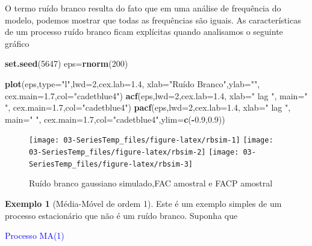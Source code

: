 \documentclass[
]{book}
\newenvironment{Shaded}{\begin{snugshade}}{\end{snugshade}}
\newcommand{\DataTypeTok}[1]{\textcolor[rgb]{0.13,0.29,0.53}{#1}}
\newcommand{\DecValTok}[1]{\textcolor[rgb]{0.00,0.00,0.81}{#1}}
\newcommand{\FloatTok}[1]{\textcolor[rgb]{0.00,0.00,0.81}{#1}}
\newcommand{\KeywordTok}[1]{\textcolor[rgb]{0.13,0.29,0.53}{\textbf{#1}}}
\newcommand{\NormalTok}[1]{#1}
\newcommand{\OperatorTok}[1]{\textcolor[rgb]{0.81,0.36,0.00}{\textbf{#1}}}
\newcommand{\StringTok}[1]{\textcolor[rgb]{0.31,0.60,0.02}{#1}}
\theoremstyle{definition}
\theoremstyle{definition}
\newtheorem{example}{Exemplo}[chapter]
\theoremstyle{definition}
\theoremstyle{remark}
\begin{document}
O termo ruído branco resulta do fato que em uma análise de frequência do modelo, podemos mostrar que todas as frequências são iguais. As características de um processo ruído branco ficam explícitas quando analisamos o seguinte gráfico

\begin{Shaded}
\begin{Highlighting}[]
\KeywordTok{set.seed}\NormalTok{(}\DecValTok{5647}\NormalTok{)}
\NormalTok{eps=}\KeywordTok{rnorm}\NormalTok{(}\DecValTok{200}\NormalTok{)}

\KeywordTok{plot}\NormalTok{(eps,}\DataTypeTok{type=}\StringTok{"l"}\NormalTok{,}\DataTypeTok{lwd=}\DecValTok{2}\NormalTok{,}\DataTypeTok{cex.lab=}\FloatTok{1.4}\NormalTok{, }\DataTypeTok{xlab=}\StringTok{"Ruído Branco"}\NormalTok{,}\DataTypeTok{ylab=}\StringTok{""}\NormalTok{, }\DataTypeTok{cex.main=}\FloatTok{1.7}\NormalTok{,}\DataTypeTok{col=}\StringTok{"cadetblue4"}\NormalTok{)}
\KeywordTok{acf}\NormalTok{(eps,}\DataTypeTok{lwd=}\DecValTok{2}\NormalTok{,}\DataTypeTok{cex.lab=}\FloatTok{1.4}\NormalTok{, }\DataTypeTok{xlab=}\StringTok{" lag "}\NormalTok{, }\DataTypeTok{main=}\StringTok{" "}\NormalTok{, }\DataTypeTok{cex.main=}\FloatTok{1.7}\NormalTok{,}\DataTypeTok{col=}\StringTok{"cadetblue4"}\NormalTok{)}
\KeywordTok{pacf}\NormalTok{(eps,}\DataTypeTok{lwd=}\DecValTok{2}\NormalTok{,}\DataTypeTok{cex.lab=}\FloatTok{1.4}\NormalTok{, }\DataTypeTok{xlab=}\StringTok{" lag "}\NormalTok{, }\DataTypeTok{main=}\StringTok{" "}\NormalTok{, }\DataTypeTok{cex.main=}\FloatTok{1.7}\NormalTok{,}\DataTypeTok{col=}\StringTok{"cadetblue4"}\NormalTok{,}\DataTypeTok{ylim=}\KeywordTok{c}\NormalTok{(}\OperatorTok{-}\FloatTok{0.9}\NormalTok{,}\FloatTok{0.9}\NormalTok{))}
\end{Highlighting}
\end{Shaded}

\begin{figure}
\texttt{[image: 03-SeriesTemp\_files/figure-latex/rbsim-1]} \texttt{[image: 03-SeriesTemp\_files/figure-latex/rbsim-2]} \texttt{[image: 03-SeriesTemp\_files/figure-latex/rbsim-3]} \caption{ Ruído branco gaussiano simulado,FAC amostral e FACP  amostral}\label{fig:rbsim}
\end{figure}

\begin{example}[Média-Móvel de ordem 1]
\protect\hypertarget{exm:unnamed-chunk-2}{}{\label{exm:unnamed-chunk-2} {} }Este é um exemplo simples de um processo estacionário que não é um ruído branco. Suponha que
\end{example}
\textcolor{blue}{ Processo MA(1)}
\end{document}
